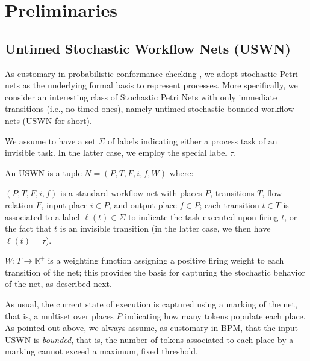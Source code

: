\newcommand{\uswn}{USWN\xspace}
\newcommand{\net}{\ensuremath{N}}
\newcommand{\marking}{m}
\newcommand{\enaset}[2]{E_{#2}(#1)}
\newcommand{\fire}[4]{#1\xrightarrow{#2}_{#4}#3}
\newcommand{\prob}[3]{\mathbb{P}_{#2,#3}(#1)}
\newcommand{\rg}[1]{RG(#1)}
 
\section{Preliminaries}
\subsection{Untimed Stochastic Workflow Nets (USWN)}\label{subsec:spn}
As customary in probabilistic conformance checking \cite{lavori-su-prob-conformance}, we adopt stochastic Petri nets \cite{MarsanCB84,Desel1998,RoggeSoltiAW13} as the underlying formal basis to represent processes. More specifically, we consider an interesting class of Stochastic Petri Nets with only immediate transitions (i.e., no timed ones), namely untimed stochastic bounded workflow nets (\uswn for short). 

We assume to have a set $\Sigma$ of labels indicating either a process task of an invisible task. In the latter case, we employ the special label $\tau$.

An \uswn is a tuple $\net = (P,T,F,i,f,W)$ where:
\begin{compactitem}
\item $(P,T,F,i,f)$ is a standard workflow net with places $P$, transitions $T$, flow relation $F$, input place $i \in P$, and output place $f \in P$; each transition $t \in T$ is associated to a label $\ell(t) \in \Sigma$ to indicate the task executed upon firing $t$, or the fact that $t$ is an invisible transition (in the latter case, we then have $\ell(t) = \tau$). 
\item $W\colon T\to \mathbb{R}^+$ is a weighting function assigning a positive firing weight to each transition of the net; this provides the basis for capturing the stochastic behavior of the net, as described next.
\end{compactitem}

As usual, the current state of execution is captured using a marking of the net, that is, a multiset over places $P$ indicating how many tokens populate each place. As pointed out above, we always assume, as customary in BPM, that the input \uswn is \emph{bounded}, that is, the number of tokens associated to each place by a marking cannot exceed a maximum, fixed threshold.



